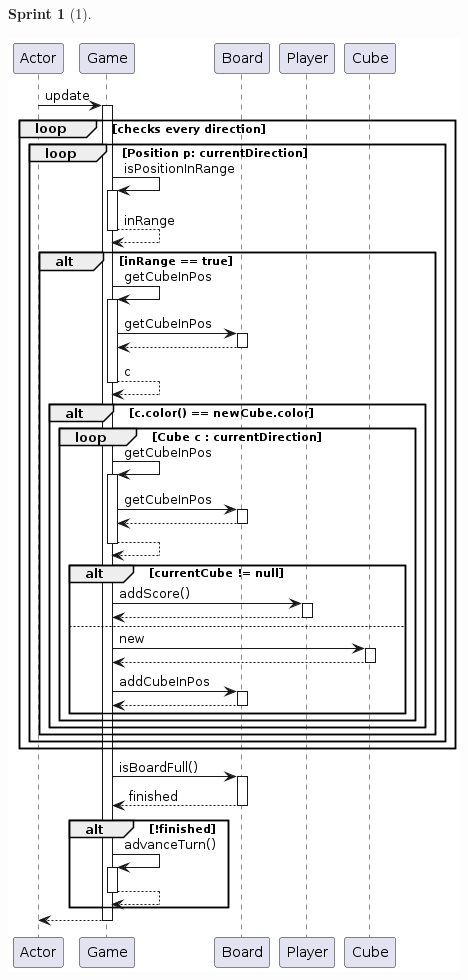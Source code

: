 \documentclass[12pt,a4paper,openright]{book}
\theoremstyle{break}
\newtheorem*{sprint}{Sprint}
\begin{document}
\begin{sprint}[1]
\begin{center}
\includegraphics[scale=0.5]{updateGameS1.png}
\end{center}

\end{sprint}
\newpage
\end{document}

